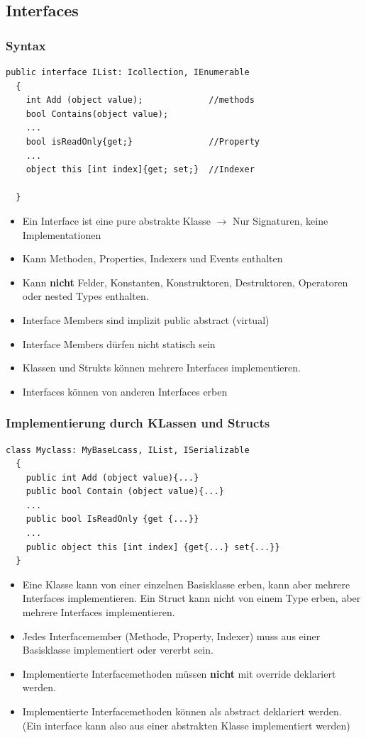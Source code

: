 \subsection{Interfaces}
\subsubsection{Syntax}
\begin{lstlisting}[style=C]
  public interface IList: Icollection, IEnumerable
  {
    int Add (object value);             //methods
    bool Contains(object value);        
    ...
    bool isReadOnly{get;}               //Property
    ...
    object this [int index]{get; set;}  //Indexer
    
  }
\end{lstlisting}
\begin{itemize}
  \item Ein Interface ist eine pure abstrakte Klasse $\rightarrow$ Nur
  Signaturen, keine Implementationen
  \item Kann Methoden, Properties, Indexers und Events enthalten
  \item Kann \textbf{nicht} Felder, Konstanten, Konstruktoren, Destruktoren,
  Operatoren oder nested Types enthalten. 
  \item Interface Members sind implizit public abstract (virtual)
  \item Interface Members dürfen nicht statisch sein
  \item Klassen und Strukts können mehrere Interfaces implementieren. 
  \item Interfaces können von anderen Interfaces erben
\end{itemize}

\subsubsection{Implementierung durch KLassen und Structs}
\begin{lstlisting}[style=C]
  class Myclass: MyBaseLcass, IList, ISerializable
  {
    public int Add (object value){...}
    public bool Contain (object value){...}
    ...
    public bool IsReadOnly {get {...}}
    ...
    public object this [int index] {get{...} set{...}}
  }
\end{lstlisting}
\begin{itemize}
\item Eine Klasse kann von einer einzelnen Basisklasse erben, kann aber mehrere
Interfaces implementieren. Ein Struct kann nicht von einem Type erben, aber
mehrere Interfaces implementieren. 
\item Jedes Interfacemember (Methode, Property, Indexer) muss aus einer
Basisklasse implementiert oder vererbt sein. 
\item Implementierte Interfacemethoden müssen \textbf{nicht} mit override
deklariert werden. 
\item Implementierte Interfacemethoden können als abstract deklariert werden.
(Ein interface kann also aus einer abstrakten Klasse implementiert werden)
\end{itemize}

